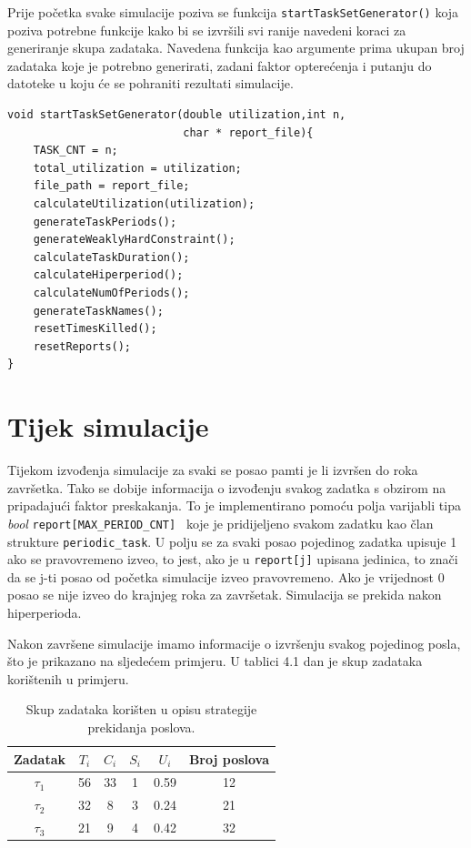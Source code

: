 \documentclass[../zavrsni.tex]{subfiles}
\begin{document}
Prije početka svake simulacije poziva se funkcija \texttt{startTaskSetGenerator()} koja poziva potrebne funkcije kako bi se izvršili 
svi ranije navedeni koraci za generiranje skupa zadataka. Navedena funkcija kao argumente prima ukupan broj zadataka koje je potrebno generirati, zadani 
faktor opterećenja i putanju do datoteke u koju će se pohraniti rezultati simulacije.
\begin{lstlisting}[style=CStyle,caption={Funckija \texttt{startTaskSetGenerator()}},captionpos=b]
void startTaskSetGenerator(double utilization,int n,
                           char * report_file){
    TASK_CNT = n; 
    total_utilization = utilization; 
    file_path = report_file;
    calculateUtilization(utilization);
    generateTaskPeriods();
    generateWeaklyHardConstraint();
    calculateTaskDuration();
    calculateHiperperiod();
    calculateNumOfPeriods();
    generateTaskNames();
    resetTimesKilled();
    resetReports();
}
\end{lstlisting}
\section{Tijek simulacije}

Tijekom izvođenja simulacije za svaki se posao pamti je li izvršen do roka završetka.  
Tako se dobije informacija o izvođenju svakog zadatka s obzirom na pripadajući faktor preskakanja. To je implementirano 
pomoću polja varijabli tipa \textit{bool} \texttt{report[MAX\_PERIOD\_CNT] } koje je pridijeljeno svakom zadatku kao član strukture \texttt{periodic\_task}.
U polju se za svaki posao pojedinog zadatka upisuje 1 ako se pravovremeno izveo, to jest, ako je u \texttt{report[j]} upisana jedinica, to znači da se 
j-ti posao od početka simulacije izveo pravovremeno. Ako je vrijednost 0 posao se nije izveo do krajnjeg roka za završetak.
Simulacija se prekida nakon hiperperioda.

Nakon završene simulacije imamo informacije o izvršenju svakog pojedinog posla, što je prikazano na sljedećem primjeru. U tablici 4.1 dan je 
skup zadataka korištenih u primjeru.

\begin{table}[h!]
    \begin{center}
      \begin{tabular}{||c || c | c | c | c | c||} 
       \hline
       Zadatak & $T_i$ & $C_i$ & $S_i$ & $U_i$ & Broj poslova \\ [0.5ex] 
       \hline\hline
       $\tau_1$ & 56 & 33 & 1 & 0.59 & 12 \\ 
       \hline
       $\tau_2$ & 32 & 8 & 3 & 0.24 & 21 \\
       \hline
       $\tau_3$ & 21 & 9 & 4 & 0.42 & 32 \\
       \hline
      \end{tabular}
    \end{center}
    \caption{\label{tab:table-name}Skup zadataka korišten u opisu strategije prekidanja poslova.}
    \end{table}
\end{document}
